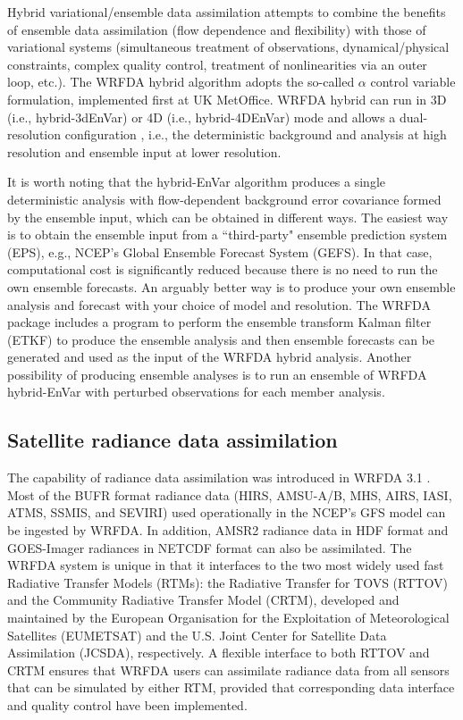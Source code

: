 Hybrid variational/ensemble data assimilation attempts to combine the benefits of ensemble data assimilation 
(flow dependence and flexibility) with those of variational systems (simultaneous treatment of observations,
dynamical/physical constraints, complex quality control, treatment of nonlinearities via an outer
loop, etc.). The WRFDA hybrid algorithm \citep{wang08a, wang08b} adopts the so-called $\alpha$ control variable formulation, 
implemented first at UK MetOffice. WRFDA hybrid can run in 3D (i.e., hybrid-3dEnVar) or 
4D (i.e., hybrid-4DEnVar) mode and allows a dual-resolution configuration \citep{schwartz15}, i.e., the deterministic
background and analysis at high resolution and ensemble input at lower resolution. 

It is worth noting that the hybrid-EnVar algorithm produces a single deterministic analysis with flow-dependent background
error covariance formed by the ensemble input, which can be obtained in different ways.
The easiest way is to obtain the ensemble input from a ``third-party" ensemble prediction system (EPS), e.g.,
NCEP's Global Ensemble Forecast System (GEFS). In that case, computational cost is significantly reduced
because there is no need to run the own ensemble forecasts.
An arguably better way is to produce your own ensemble analysis and forecast with your choice of model and resolution.
The WRFDA package includes a program to perform the ensemble transform Kalman filter (ETKF) to produce the ensemble
analysis and then ensemble forecasts can be generated and used as the input of the WRFDA hybrid analysis.
Another possibility of producing ensemble analyses is to run an ensemble of WRFDA hybrid-EnVar with perturbed observations for each member analysis.

\subsection{Satellite radiance data assimilation}

The capability of radiance data assimilation was introduced in WRFDA 3.1 \citep{liu06}.
Most of the BUFR format radiance data (HIRS, AMSU-A/B, MHS, AIRS, IASI, ATMS, SSMIS, and SEVIRI) 
used operationally in the NCEP's GFS model can be ingested by WRFDA. In addition, AMSR2 radiance data
in HDF format \citep{yang16} and GOES-Imager radiances in NETCDF format \citep{yang17} can also be assimilated.
The WRFDA system is unique in that it interfaces to the two most widely used fast Radiative Transfer Models (RTMs): 
the Radiative Transfer for TOVS (RTTOV) and the Community Radiative Transfer Model (CRTM),
 developed and maintained by the European Organisation for the Exploitation of Meteorological Satellites (EUMETSAT) and
the U.S. Joint Center for Satellite Data Assimilation (JCSDA), respectively. A flexible interface to both RTTOV and CRTM
ensures that WRFDA users can assimilate radiance data from all sensors that can be simulated by either
RTM, provided that corresponding data interface and quality control have been implemented.

